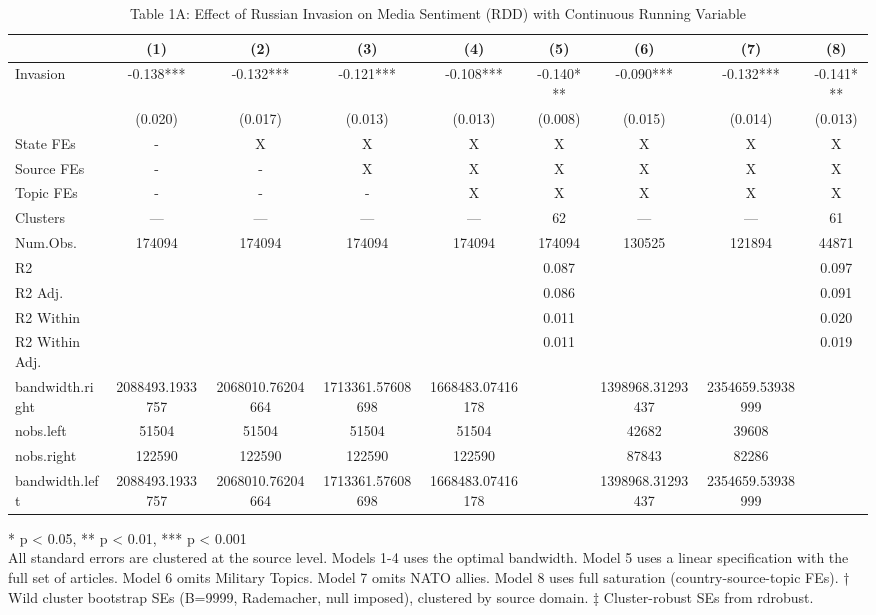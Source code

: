 \begin{table}[!t]
\caption{Table 1A: Effect of Russian Invasion on Media Sentiment (RDD) with Continuous Running Variable} 
\fontsize{12.0pt}{14.4pt}\selectfont
\begin{tabular*}{\linewidth}{@{\extracolsep{\fill}}lcccccccc}
\toprule
  & (1) & (2) & (3) & (4) & (5) & (6) & (7) & (8) \\ 
\midrule\addlinespace[2.5pt]
Invasion & -0.138*** & -0.132*** & -0.121*** & -0.108*** & -0.140*** & -0.090*** & -0.132*** & -0.141*** \\ 
{} & {(0.020)} & {(0.017)} & {(0.013)} & {(0.013)} & {(0.008)} & {(0.015)} & {(0.014)} & {(0.013)} \\ 
State FEs & - & X & X & X & X & X & X & X \\ 
Source FEs & - & - & X & X & X & X & X & X \\ 
Topic FEs & - & - & - & X & X & X & X & X \\ 
Clusters & — & — & — & — & 62 & — & — & 61 \\ 
Num.Obs. & 174094 & 174094 & 174094 & 174094 & 174094 & 130525 & 121894 & 44871 \\ 
R2 &  &  &  &  & 0.087 &  &  & 0.097 \\ 
R2 Adj. &  &  &  &  & 0.086 &  &  & 0.091 \\ 
R2 Within &  &  &  &  & 0.011 &  &  & 0.020 \\ 
R2 Within Adj. &  &  &  &  & 0.011 &  &  & 0.019 \\ 
bandwidth.right & 2088493.1933757 & 2068010.76204664 & 1713361.57608698 & 1668483.07416178 &  & 1398968.31293437 & 2354659.53938999 &  \\ 
nobs.left & 51504 & 51504 & 51504 & 51504 &  & 42682 & 39608 &  \\ 
nobs.right & 122590 & 122590 & 122590 & 122590 &  & 87843 & 82286 &  \\ 
bandwidth.left & 2088493.1933757 & 2068010.76204664 & 1713361.57608698 & 1668483.07416178 &  & 1398968.31293437 & 2354659.53938999 &  \\ 
\bottomrule
\end{tabular*}
\begin{minipage}{\linewidth}
* p < 0.05, ** p < 0.01, *** p < 0.001\\
All standard errors are clustered at the source level. Models 1-4 uses the
optimal bandwidth. Model 5 uses a linear specification with the full set of
articles. Model 6 omits Military Topics. Model 7 omits NATO allies. Model 8
uses full saturation (country-source-topic FEs). † Wild cluster bootstrap SEs
(B=9999, Rademacher, null imposed), clustered by source domain. ‡ Cluster-robust
SEs from rdrobust.\\
\end{minipage}
\end{table}

